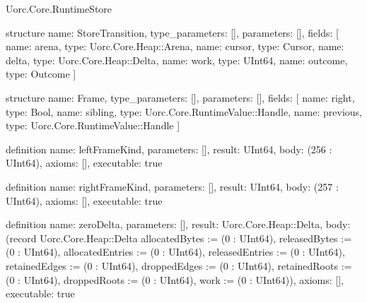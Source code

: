 \begin{lexlean}{Uorc.Core.RuntimeStore}
\begin{semanticmodule}
structure{
  name: StoreTransition,
  type_parameters: [],
  parameters: [],
  fields: [
    {name: arena, type: Uorc.Core.Heap::Arena},
    {name: cursor, type: Cursor},
    {name: delta, type: Uorc.Core.Heap::Delta},
    {name: work, type: UInt64},
    {name: outcome, type: Outcome}
  ]
}

structure{
  name: Frame,
  type_parameters: [],
  parameters: [],
  fields: [
    {name: right, type: Bool},
    {name: sibling, type: Uorc.Core.RuntimeValue::Handle},
    {name: previous, type: Uorc.Core.RuntimeValue::Handle}
  ]
}

definition{
  name: leftFrameKind,
  parameters: [],
  result: UInt64,
  body: (256 : UInt64),
  axioms: [],
  executable: true
}

definition{
  name: rightFrameKind,
  parameters: [],
  result: UInt64,
  body: (257 : UInt64),
  axioms: [],
  executable: true
}

definition{
  name: zeroDelta,
  parameters: [],
  result: Uorc.Core.Heap::Delta,
  body: (record Uorc.Core.Heap::Delta {allocatedBytes := (0 : UInt64), releasedBytes := (0 : UInt64), allocatedEntries := (0 : UInt64), releasedEntries := (0 : UInt64), retainedEdges := (0 : UInt64), droppedEdges := (0 : UInt64), retainedRoots := (0 : UInt64), droppedRoots := (0 : UInt64), work := (0 : UInt64)}),
  axioms: [],
  executable: true
}


\end{semanticmodule}
\end{lexlean}

